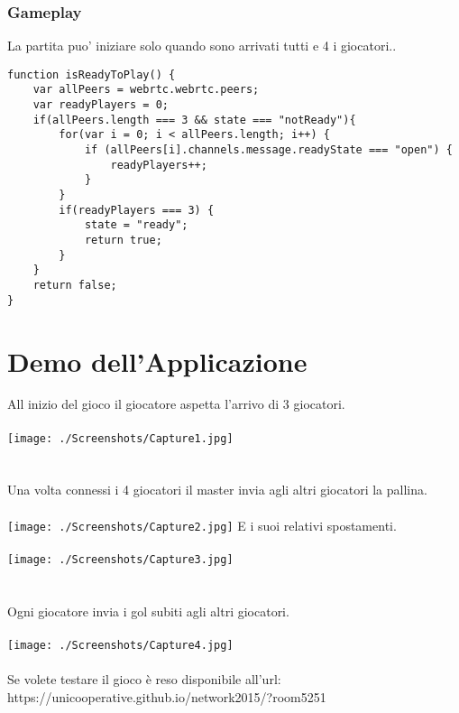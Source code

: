 \documentclass[11pt, a4paper, titlepage, block]{article}
\begin{document}
\subsubsection{Gameplay}
	La partita puo' iniziare solo quando sono arrivati tutti e 4 i giocatori..

	\begin{lstlisting}
function isReadyToPlay() {
	var allPeers = webrtc.webrtc.peers;
	var readyPlayers = 0;
	if(allPeers.length === 3 && state === "notReady"){
		for(var i = 0; i < allPeers.length; i++) {
			if (allPeers[i].channels.message.readyState === "open") {
				readyPlayers++;
			}
		}
		if(readyPlayers === 3) {
			state = "ready";
			return true;
		}
	}
	return false;
}
\end{lstlisting}
\newpage
\section{Demo dell'Applicazione}

All inizio del gioco il giocatore aspetta l'arrivo di 3 giocatori.\\\\
\texttt{[image: ./Screenshots/Capture1.jpg]}
\\
\\
\\
Una volta connessi i 4 giocatori il master invia agli altri giocatori la pallina.\\\\
\texttt{[image: ./Screenshots/Capture2.jpg]}
\newpage
E i suoi relativi spostamenti.\\\\
\texttt{[image: ./Screenshots/Capture3.jpg]}
\\
\\
\\
Ogni giocatore invia i gol subiti agli altri giocatori.\\\\
\texttt{[image: ./Screenshots/Capture4.jpg]}
\\
\\
Se volete testare il gioco \`e reso disponibile all'url: \\https://unicooperative.github.io/network2015/?room5251
\end{document}
